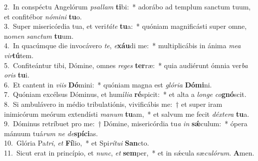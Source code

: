 {2.~}In conspéctu Angelórum \textit{psal}\textit{lam} \textbf{ti}bi:~* adorábo ad templum sanctum tuum, et confitébor \textit{nó}\textit{mi}\textit{ni} \textbf{tu}o.\\
{3.~}Super misericórdia tua, et veri\textit{tá}\textit{te} \textbf{tu}a:~* quóniam magnificásti super omne, no\textit{men} \textit{san}\textit{ctum} \textbf{tu}um.\\
{4.~}In quacúmque die invocávero \textit{te}, \textit{e}\textbf{xáu}di me:~* multiplicábis in ánima \textit{me}\textit{a} \textit{vir}\textbf{tú}tem.\\
{5.~}Confiteántur tibi, Dómine, omnes \textit{re}\textit{ges} \textbf{ter}ræ:~* quia audiérunt ómnia ver\textit{ba} \textit{o}\textit{ris} \textbf{tu}i.\\
{6.~}Et cantent in \textit{vi}\textit{is} \textbf{Dó}mini:~* quóniam magna est \textit{gló}\textit{ri}\textit{a} \textbf{Dó}\textbf{mi}ni.\\
{7.~}Quóniam excélsus Dóminus, et humí\textit{li}\textit{a} \textbf{ré}spicit:~* et alta a \textit{lon}\textit{ge} \textit{co}\textbf{gnó}scit.\\
{8.~}Si ambulávero in médio tribulatiónis, vivificábis me:~† et super iram inimicórum meórum extendísti \textit{ma}\textit{num} \textbf{tu}am,~* et salvum me fecit \textit{déx}\textit{te}\textit{ra} \textbf{tu}a.\\
{9.~}Dóminus retríbuet pro me:~† Dómine, misericórdia tu\textit{a} \textit{in} \textbf{sǽ}culum:~* ópera mánuum tuá\textit{rum} \textit{ne} \textit{de}\textbf{spí}\textbf{ci}as.\\
{10.~}Glória Pa\textit{tri}, \textit{et} \textbf{Fí}lio,~* et Spi\textit{rí}\textit{tu}\textit{i} \textbf{San}cto.\\
{11.~}Sicut erat in princípio, et \textit{nunc}, \textit{et} \textbf{sem}per,~* et in sǽcula sæ\textit{cu}\textit{ló}\textit{rum}. \textbf{A}men.\\
